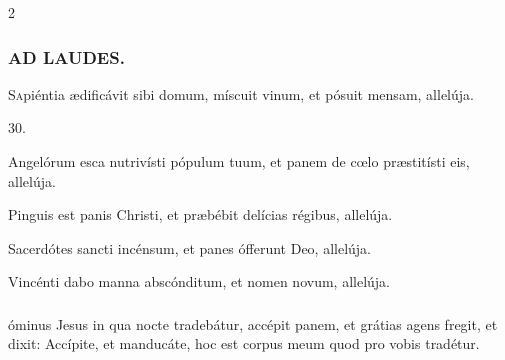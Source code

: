 \documentclass[9pt,twoside]{extarticle}
\begin{document}
\begin{multicols}{2}
\subsubsection*{\center \textsc{AD LAUDES.}}
\begin{center}\end{center}
\lettrine{S}apiéntia ædificávit sibi domum, míscuit vinum, et pósuit mensam, allelúja.

\begin{tightlist}{}
\item {} 30.
\item {} Angelórum esca nutrivísti pópulum tuum, et panem de cœlo præstitísti eis, allelúja.
\item {} Pinguis est panis Christi, et præbébit delícias régibus, allelúja.
\item {} Sacerdótes sancti incénsum, et panes ófferunt Deo, allelúja.
\item {} Vincénti dabo manna abscónditum, et nomen novum, allelúja.
\end{tightlist}

\subsubsection*{}
óminus Jesus in qua nocte tradebátur, accépit panem, et grátias agens fregit, et dixit: Accípite, et manducáte, hoc est corpus meum quod pro vobis tradétur.


\end{multicols}
\end{document}
